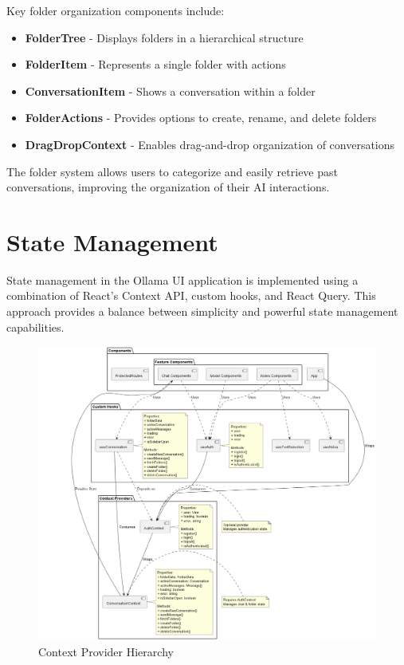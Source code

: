 Key folder organization components include:

\begin{itemize}
  \item \textbf{FolderTree} - Displays folders in a hierarchical structure
  \item \textbf{FolderItem} - Represents a single folder with actions
  \item \textbf{ConversationItem} - Shows a conversation within a folder
  \item \textbf{FolderActions} - Provides options to create, rename, and delete folders
  \item \textbf{DragDropContext} - Enables drag-and-drop organization of conversations
\end{itemize}

The folder system allows users to categorize and easily retrieve past conversations, improving the organization of their AI interactions.

\section{State Management}

State management in the Ollama UI application is implemented using a combination of React's Context API, custom hooks, and React Query. This approach provides a balance between simplicity and powerful state management capabilities.

\begin{figure}[p]
    \centering
    \includegraphics[width=\textwidth]{./Chapter07/figures/context_provider_hierarchy.png}
    \caption{Context Provider Hierarchy}
    \label{fig:context-provider-hierarchy}
\end{figure}
\clearpage

